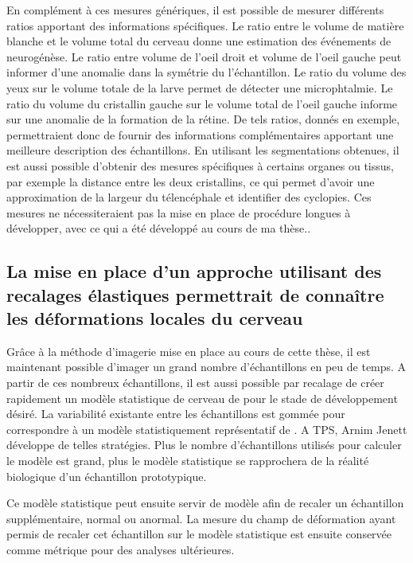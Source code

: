 \documentclass[\main/main.tex]{subfiles}
\begin{document}
En complément à ces mesures génériques, il est possible de mesurer différents ratios apportant des informations spécifiques. Le ratio entre le volume de matière blanche et le volume total du cerveau donne une estimation des événements de neurogénèse. Le ratio entre volume de l'oeil droit et volume de l'oeil gauche peut informer d'une anomalie dans la symétrie du l'échantillon. Le ratio du volume des yeux sur le volume totale de la larve permet de détecter une microphtalmie.
Le ratio du volume du cristallin gauche sur le volume total de l'oeil gauche informe sur une anomalie de la formation de la rétine.
%
De tels ratios, donnés en exemple, permettraient donc de fournir des informations complémentaires apportant une meilleure description des échantillons.
En utilisant les segmentations obtenues, il est aussi possible d'obtenir des mesures spécifiques à certains organes ou tissus, par exemple la distance entre les deux cristallins, ce qui permet d'avoir une approximation de la largeur du télencéphale et identifier des cyclopies.
Ces mesures ne nécessiteraient pas la mise en place de procédure longues à développer, avec ce qui a été développé au cours de ma thèse..

    \subsection{La mise en place d'un approche utilisant des recalages élastiques permettrait de connaître les déformations locales du cerveau}
    
Grâce à la méthode d'imagerie mise en place au cours de cette thèse,
il est maintenant possible d'imager un grand nombre d'échantillons en peu de temps. A partir de ces nombreux échantillons, il est aussi possible par recalage de créer rapidement un modèle statistique de cerveau de \pz{} pour le stade de développement désiré. La variabilité existante entre les échantillons est gommée pour correspondre à un modèle statistiquement représentatif de \pz.
A TPS, Arnim Jenett développe de telles stratégies.
Plus le nombre d'échantillons utilisés pour calculer le modèle est grand, plus le modèle statistique se rapprochera de la réalité biologique d'un échantillon prototypique.

%
Ce modèle statistique peut ensuite servir de modèle afin de recaler un échantillon supplémentaire, normal ou anormal. La mesure du champ de déformation ayant permis de recaler cet échantillon sur le modèle statistique est ensuite conservée comme métrique pour des analyses ultérieures.
\end{document}
